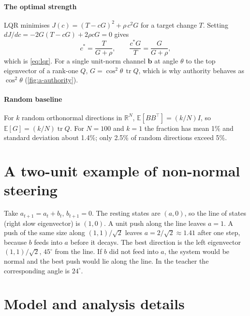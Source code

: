 \documentclass[11pt,a4paper]{article}
\newcommand{\vect}[1]{\bm{#1}}
\newcommand{\tr}{\operatorname{tr}}
\begin{document}
\paragraph{The optimal strength} LQR minimises $J(c) = (T - cG)^2 + \rho\,c^2G$ for a target change $T$. Setting $dJ/dc = -2G(T-cG) + 2\rho cG = 0$ gives
\begin{equation}
  c^* = \frac{T}{G+\rho}, \qquad \frac{c^*G}{T} = \frac{G}{G+\rho},
\end{equation}
which is \cref{eq:lqr}. For a single unit-norm channel $\vect b$ at angle $\theta$ to the top eigenvector of a rank-one $Q$, $G = \cos^2\theta\,\tr Q$, which is why authority behaves as $\cos^2\theta$ (\cref{fig:a-authority}).

\paragraph{Random baseline} For $k$ random orthonormal directions in $\mathbb R^N$, $\mathbb E[BB^\top] = (k/N)I$, so $\mathbb E[G] = (k/N)\tr Q$. For $N=100$ and $k=1$ the fraction has mean 1\% and standard deviation about 1.4\%; only 2.5\% of random directions exceed 5\%.

\section{A two-unit example of non-normal steering}\label{app:nonnormal}

Take $a_{t+1} = a_t + b_t$, $b_{t+1} = 0$. The resting states are $(a,0)$, so the line of states (right slow eigenvector) is $(1,0)$. A unit push along the line leaves $a=1$. A push of the same size along $(1,1)/\sqrt2$ leaves $a = 2/\sqrt2 \approx 1.41$ after one step, because $b$ feeds into $a$ before it decays. The best direction is the left eigenvector $(1,1)/\sqrt2$, $45^\circ$ from the line. If $b$ did not feed into $a$, the system would be normal and the best push would lie along the line. In the teacher the corresponding angle is $24^\circ$.

\section{Model and analysis details}\label{app:details}
\end{document}
